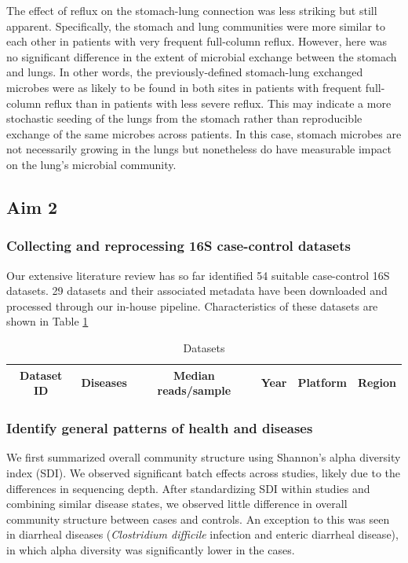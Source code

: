 \documentclass[12pt]{article}
\begin{document}
The effect of reflux on the stomach-lung connection was less striking 
but still apparent. Specifically, the stomach and lung communities were
more similar to each other in patients with very frequent full-column reflux. However, here was no significant difference in the extent of
microbial exchange between the stomach and lungs. In other words,
the previously-defined stomach-lung exchanged microbes were as likely
to be found in both sites in patients with frequent full-column reflux
than in patients with less severe reflux. This may indicate a more
stochastic seeding of the lungs from the stomach rather than reproducible
exchange of the same microbes across patients. In this case, stomach 
microbes are not necessarily growing in the lungs but nonetheless do have 
measurable impact on the lung's microbial community.

\subsection{Aim 2}
\subsubsection{Collecting and reprocessing 16S case-control datasets}
Our extensive literature review has so far identified 54 suitable case-control 16S datasets.
29 datasets and their associated metadata have been downloaded and processed through our in-house pipeline.
Characteristics of these datasets are shown in Table \ref{tab:datasets}

\begin{table}
\begin{tabular}{|c|c|c|c|c|c|}
	\hline
	\textbf{Dataset ID} & \textbf{Diseases} & \textbf{Median reads/sample} & \textbf{Year} & \textbf{Platform} & \textbf{Region} \\
	\hline 
\end{tabular}
\caption{Datasets}\label{tab:datasets}
\end{table}

\subsubsection{Identify general patterns of health and diseases}
We first summarized overall community structure using Shannon's alpha diversity
index (SDI). We observed significant batch effects across studies, likely due to
the differences in sequencing depth. After standardizing SDI within studies
and combining similar disease states, we observed little difference in overall
community structure between cases and controls. An exception to this was seen
in diarrheal diseases (\textit{Clostridium difficile} infection and enteric 
diarrheal disease), in which alpha diversity was significantly lower in the cases. 
\end{document}

